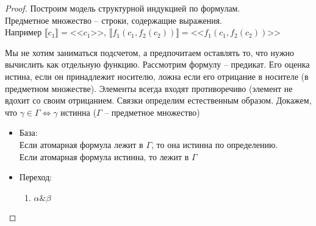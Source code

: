 \begin{proof}
Построим модель структурной индукцией по формулам.\\
Предметное множество -- строки, содержащие выражения.\\
Например $\llbracket c_1 \rrbracket = \text{<<$c_1$>>}$,
$\llbracket f_1 (c_1, f_2(c_2)) \rrbracket = \text{<<$f_1 (c_1, f_2(c_2))$>>}$

Мы не хотим заниматься подсчетом, а предпочитаем оставлять то, что нужно вычислить как отдельную функцию. Рассмотрим формулу -- предикат. Его оценка истина, если он принадлежит носителю, ложна если его отрицание в носителе (в предметном множестве). Элементы всегда входят противоречиво (элемент не вдохит со своим отрицанием. Связки определим естественным образом. Докажем, что $\gamma \in \Gamma \Leftrightarrow \gamma$ истинна ($\Gamma$ -- предметное множество)
\begin{itemize}
\item База:\\
Если атомарная формула лежит в $\Gamma$, то она истинна по определению.\\
Если атомарная формула истинна, то лежит в $\Gamma$
\item Переход:
\begin{enumerate}
\item $\alpha \& \beta$


\end{enumerate}
\end{itemize}
\end{proof}
